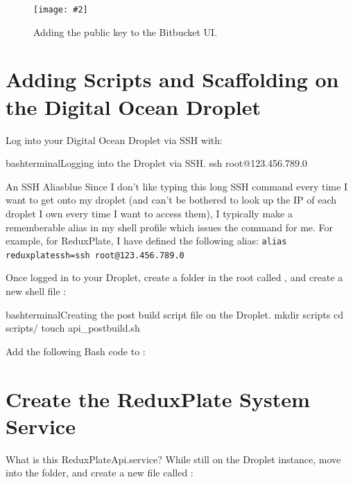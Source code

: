 \documentclass[a4paper,headinclude=on,footinclude=on,12pt,oneside]{scrbook}
\newcommand{\standardfigure}[3]{\begin{figure}[H]\begin{center}\texttt{[image: \#2]}\caption{#3}\label{fig:#2}\end{center}\end{figure}}
\begin{document}
\standardfigure{\textwidth}{backend/bitbucket/access-key-ui}{Adding the public key to the Bitbucket UI.}

\section{Adding Scripts and Scaffolding on the Digital Ocean Droplet}

Log into your Digital Ocean Droplet via SSH with:

\begin{codeInput}{bash}{terminal}{Logging into the Droplet via SSH.}
ssh root@123.456.789.0
\end{codeInput}

\begin{highlightBox}{An SSH Alias}{blue}{\information}
Since I don't like typing this long SSH command every time I want to get onto my droplet (and can't be bothered to look up the IP of each droplet I own every time I want to access them), I typically make a rememberable alias in my shell profile which issues the command for me. For example, for ReduxPlate, I have defined the following alias: \texttt{alias reduxplatessh=ssh root@123.456.789.0}
\end{highlightBox}


Once logged in to your Droplet, create a folder in the root called , and create a new shell file : 

\begin{codeInput}{bash}{terminal}{Creating the post build script file on the Droplet.}
mkdir scripts
cd scripts/
touch api_postbuild.sh
\end{codeInput}

Add the following Bash code to :


\section{Create the ReduxPlate System Service}

What is this ReduxPlateApi.service? While still on the Droplet instance, move into the  folder, and create a new file called :
\end{document}
